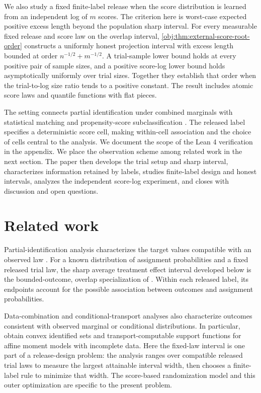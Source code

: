 \documentclass[11pt]{article}
\begin{document}
We also study a fixed finite-label release when the score distribution is learned from an independent log of \(m\) scores. The criterion here is worst-case expected positive excess length beyond the population sharp interval. For every measurable fixed release and score law on the overlap interval, \cref{obj:thm:external-score-root-order} constructs a uniformly honest projection interval with excess length bounded at order \(n^{-1/2}+m^{-1/2}\). A trial-sample lower bound holds at every positive pair of sample sizes, and a positive score-log lower bound holds asymptotically uniformly over trial sizes. Together they establish that order when the trial-to-log size ratio tends to a positive constant. The result includes atomic score laws and quantile functions with flat pieces.

The setting connects partial identification under combined marginals \citep{Manski1990,Tamer2010,Torgovitsky2019} with statistical matching \citep{DOrazio2006,Conti2017} and propensity-score subclassification \citep{Cochran1968,RosenbaumRubin1984}. The released label specifies a deterministic score cell, making within-cell association and the choice of cells central to the analysis. We document the scope of the Lean 4 verification in the appendix. We place the observation scheme among related work in the next section. The paper then develops the trial setup and sharp interval, characterizes information retained by labels, studies finite-label design and honest intervals, analyzes the independent score-log experiment, and closes with discussion and open questions.


\section{Related work}

Partial-identification analysis characterizes the target values compatible with an observed law \citep{Manski1990,HorowitzManski1995,Tamer2010}. For a known distribution of assignment probabilities and a fixed released trial law, the sharp average treatment effect interval developed below is the bounded-outcome, overlap specialization of \citet[Theorem 3.2 and eq. (3.1)]{FanShermanShum2014}. Within each released label, its endpoints account for the possible association between outcomes and assignment probabilities.

Data-combination and conditional-transport analyses also characterize outcomes consistent with observed marginal or conditional distributions. In particular, \citet[Section 3]{FanParkPassShi2025} obtain convex identified sets and transport-computable support functions for affine moment models with incomplete data. Here the fixed-law interval is one part of a release-design problem: the analysis ranges over compatible released trial laws to measure the largest attainable interval width, then chooses a finite-label rule to minimize that width. The score-based randomization model and this outer optimization are specific to the present problem.
\end{document}
